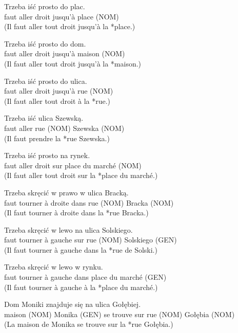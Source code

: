 \documentclass[output=paper]{langscibook}
\begin{document}
\begin{otherlanguage}{french}
\begin{paperappendix}
\begin{exe}
\gll  Trzeba   iść   prosto     do     plac.\\
     faut     aller  droit     jusqu’à     {place (NOM)}\\
\glt (Il faut aller tout droit jusqu’à la *place.)

\gll Trzeba   iść   prosto     do     dom.\\
      faut     aller  droit     jusqu’à     {maison (NOM)}\\
\glt (Il faut aller tout droit jusqu’à la *maison.)

\gll Trzeba   iść   prosto     do     ulica.\\
      faut     aller  droit     jusqu’à     {rue (NOM)}\\
\glt (Il faut aller tout droit à la *rue.)

\gll Trzeba   iść   ulica     Szewską.\\
      faut     aller  {rue (NOM)}   {Szewska (NOM)}\\
\glt (Il faut prendre la *rue Szewska.)

\gll Trzeba   iść   prosto     na   rynek.\\
      faut     aller  droit      sur   {place du marché (NOM)}\\
\glt (Il faut aller tout droit sur la *place du marché.)

\gll Trzeba   skręcić   w prawo   w   ulica     Bracką.\\
      faut     tourner   à droite     dans   {rue (NOM)} {Bracka (NOM)}\\
\glt (Il faut tourner à droite dans la *rue Bracka.)

\gll Trzeba   skręcić   w lewo     na   ulica     Solskiego.\\
      faut     tourner   à gauche   sur   {rue (NOM})   {Solskiego (GEN)}\\
\glt (Il faut tourner à gauche dans la *rue de Solski.)

\gll Trzeba   skręcić   w lewo     w   rynku.\\
      faut     tourner   à gauche   dans   {place du marché (GEN)}\\
\glt(Il faut tourner à gauche à la *place du marché.)

\gll Dom     Moniki     znajduje się   na ulica     Gołębiej.\\
      {maison (NOM)}   {Monika (GEN)} se trouve   sur {rue (NOM)} {Gołębia (NOM)}\\
\glt (La maison de Monika se trouve sur la *rue Gołębia.)


\end{exe}
\end{paperappendix}
\end{otherlanguage}
\end{document}
